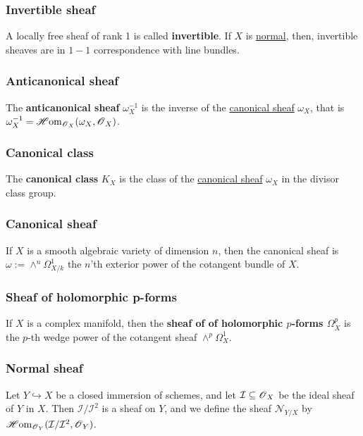 \documentclass[11pt, english]{article}
\begin{document}
\subsubsection{Invertible sheaf}
\label{invertiblesheaf}
A locally free sheaf of rank 1 is called \textbf{invertible}. If $X$ is \hyperref[normalvariety]{normal}, then, invertible sheaves are in $1-1$ correspondence with line bundles.  

\subsubsection{Anticanonical sheaf}
\label{anticanonical}

The \textbf{anticanonical sheaf} $\omega_X^{-1}$ is the inverse of the \hyperref[canonicalsheaf]{canonical sheaf} $\omega_X$, that is $\omega_X^{-1} = \operatorname{\mathscr{H}om}_{\operatorname{\mathscr{O}}_X}(\omega_X,\operatorname{\mathscr{O}}_X)$.

\subsubsection{Canonical class}
\label{canonicaldivisor}

The \textbf{canonical class} $K_X$ is the class of the \hyperref[canonicalsheaf]{canonical sheaf} $\omega_X$ in the divisor class group.

\subsubsection{Canonical sheaf}
\label{canonicalsheaf} 

If $X$ is a smooth algebraic variety of dimension $n$, then the canonical sheaf is $\omega := \wedge^n \Omega^1_{X/k}$ the $n$'th exterior power of the cotangent bundle of $X$.

\subsubsection{Sheaf of holomorphic p-forms}
\label{pforms}

If $X$ is a complex manifold, then the \textbf{sheaf of of holomorphic $p$-forms $\Omega_X^p$} is the $p$-th wedge power of the cotangent sheaf $\wedge^p \Omega_X^1$. 

\subsubsection{Normal sheaf}
\label{normalsheaf}

Let $Y \hookrightarrow X$ be a closed immersion of schemes, and let $\mathcal I \subseteq \operatorname{\mathscr{O}}_X$ be the ideal sheaf of $Y$ in $X$. Then $\mathcal I/\mathcal I^2$ is a sheaf on $Y$, and we define the sheaf $\mathcal N_{Y/X}$ by $\operatorname{\mathscr{H}om}_{\operatorname{\mathscr{O}}_Y}(\mathcal I/\mathcal I^2, \mathcal {\operatorname{\mathscr{O}}}_Y)$.
\end{document}
